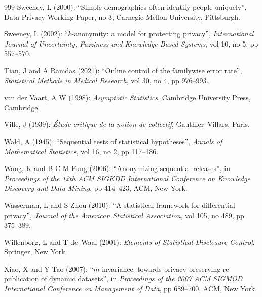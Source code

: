 \begin{thebibliography}{999}
Sweeney, L (2000): ``Simple demographics often identify people uniquely'', Data Privacy Working Paper, no 3, Carnegie Mellon University, Pittsburgh.

Sweeney, L (2002): ``$k$-anonymity: a model for protecting privacy'', \emph{International Journal of Uncertainty, Fuzziness and Knowledge-Based Systems}, vol 10, no 5, pp 557--570.

Tian, J and A Ramdas (2021): ``Online control of the familywise error rate'', \emph{Statistical Methods in Medical Research}, vol 30, no 4, pp 976--993.

van der Vaart, A W (1998): \emph{Asymptotic Statistics}, Cambridge University Press, Cambridge.

Ville, J (1939): \emph{\'Etude critique de la notion de collectif}, Gauthier--Villars, Paris.

Wald, A (1945): ``Sequential tests of statistical hypotheses'', \emph{Annals of Mathematical Statistics}, vol 16, no 2, pp 117--186.

Wang, K and B C M Fung (2006): ``Anonymizing sequential releases'', in \emph{Proceedings of the 12th ACM SIGKDD International Conference on Knowledge Discovery and Data Mining}, pp 414--423, ACM, New York.

Wasserman, L and S Zhou (2010): ``A statistical framework for differential privacy'', \emph{Journal of the American Statistical Association}, vol 105, no 489, pp 375--389.

Willenborg, L and T de~Waal (2001): \emph{Elements of Statistical Disclosure Control}, Springer, New York.

Xiao, X and Y Tao (2007): ``$m$-invariance: towards privacy preserving re-publication of dynamic datasets'', in \emph{Proceedings of the 2007 ACM SIGMOD International Conference on Management of Data}, pp 689--700, ACM, New York.

\end{thebibliography}
